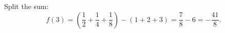 Split the sum:
\[
f(3)=\left(\dfrac{1}{2}+\dfrac{1}{4}+\dfrac{1}{8}\right)-(1+2+3)=\dfrac{7}{8}-6=\boxed{-\dfrac{41}{8}}.
\]
